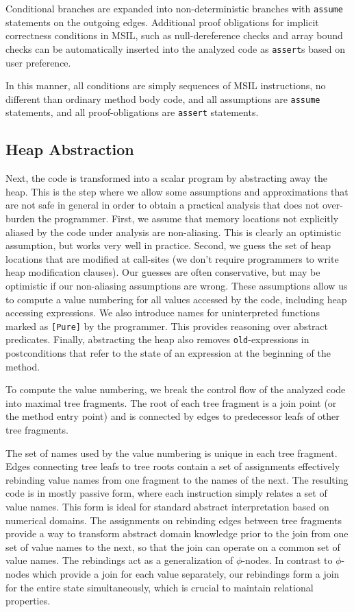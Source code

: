\documentclass{llncs}
\newcommand{\code}[1]{\lstinline{#1}}
\begin{document}
Conditional branches are expanded into non-deterministic branches with
\code{assume} statements on the outgoing edges. Additional proof
obligations for implicit correctness conditions in MSIL, such as
null-dereference checks and array bound checks can be automatically inserted into the analyzed
code as \code{assert}s based on user preference.

In this manner, all conditions are simply sequences of MSIL
instructions, no different than ordinary method body code, and all
assumptions are \code{assume} statements, and all proof-obligations
are \code{assert} statements.

\subsection{Heap Abstraction}
Next, the code is transformed into a scalar program by abstracting away
the heap. This is the step where we allow some assumptions and
approximations that are not safe in general in order to obtain a practical analysis that does not
over-burden the programmer. First, we assume that memory locations not
explicitly aliased by the code under analysis are non-aliasing. This
is clearly an optimistic assumption, but works very well in
practice. Second, we guess the set of heap locations that are modified
at call-sites (we don't require programmers to write heap modification
clauses). Our guesses are often conservative, but may be optimistic if
our non-aliasing assumptions are wrong. These assumptions allow us to
compute a value numbering for all values accessed by the code,
including heap accessing expressions. We also introduce names for
uninterpreted functions marked as \code{[Pure]} by the
programmer. This provides reasoning over abstract predicates. Finally,
abstracting the heap also removes \code{old}-expressions in postconditions
that refer to the state of an expression at the beginning of the method.

To compute the value numbering, we break the control flow of the analyzed
code into maximal tree fragments. The root of each tree fragment is a
join point (or the method entry point) and is connected by edges to
predecessor leafs of other tree fragments.

The set of names used by the value numbering is unique in each tree
fragment. Edges connecting tree leafs to tree roots contain a set of
assignments effectively rebinding value names from one fragment to the
names of the next.
The resulting code is in mostly passive form, where each
instruction simply relates a set of value names. This form is ideal
for standard abstract interpretation based on numerical domains. The
assignments on rebinding edges between tree fragments provide a way to transform
abstract domain knowledge prior to the join from one set of value
names to the next, so that the join can operate on a common set of
value names. The rebindings act as a generalization of
$\phi$-nodes. In contrast to $\phi$-nodes which provide a join for
each value separately, our rebindings form a join for the entire state
simultaneously, which is crucial to maintain relational properties.
\end{document}
